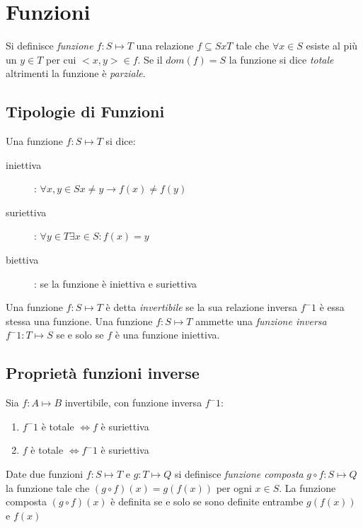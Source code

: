 \chapter{Funzioni}
Si definisce \textit{funzione $f:S \mapsto T$} una relazione $f \subseteq SxT$
tale che $\forall x \in S$ esiste al più un $y \in T$ per cui $<x,y> \in f$.\newline
Se il $dom(f) = S$ la funzione si dice \emph{totale} altrimenti la funzione è \emph{parziale}.

\section{Tipologie di Funzioni}
Una funzione $f:S \mapsto T$ si dice:
\begin{description}
    \item[iniettiva]: $\forall x,y \in S x \neq y \rightarrow f(x) \neq f(y)$
    \item[suriettiva]: $\forall y \in T \exists x \in S : f(x) = y$
    \item[biettiva]: se la funzione è iniettiva e suriettiva
\end{description}


Una funzione $f:S \mapsto T$ è detta \emph{invertibile} se la sua relazione inversa
$f ^ -1$ è essa stessa una funzione.\newline
Una funzione $f:S \mapsto T$ ammette una \emph{funzione inversa} $f ^ -1 :T \mapsto S$
se e solo se $f$ è una funzione iniettiva.

\section{Proprietà funzioni inverse}
Sia $f:A \mapsto B$ invertibile, con funzione inversa $f ^ -1$:
\begin{enumerate}
    \item $f^-1$ è totale $\iff f$ è suriettiva
    \item $f$ è totale $\iff f^-1$ è suriettiva
\end{enumerate}

Date due funzioni $f:S \mapsto T$ e $g:T \mapsto Q$ si definisce \emph{funzione composta}
$g \circ f:S \mapsto Q$ la funzione tale che $(g \circ f)(x) = g(f(x))$ per ogni $x \in S$.
La funzione composta $(g \circ f)(x)$ è definita se e solo se sono definite entrambe
$g(f(x))$ e $f(x)$

